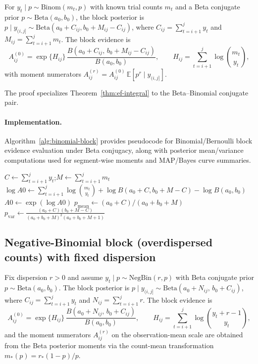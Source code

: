 \begin{proposition}
\label{prop:binomial-block}
For $y_t\mid p\sim\mathrm{Binom}(m_t,p)$ with known trial counts $m_t$ and a Beta conjugate prior
$p\sim\mathrm{Beta}(a_0,b_0)$, the block posterior is
$p\mid y_{(i,j]}\sim\mathrm{Beta}(a_0+C_{ij},b_0+M_{ij}-C_{ij})$, where
$C_{ij}=\sum_{t=i+1}^j y_t$ and $M_{ij}=\sum_{t=i+1}^j m_t$. The block evidence is
\[
A^{(0)}_{ij}
= \exp\{H_{ij}\}\,
\frac{B(a_0+C_{ij},\,b_0+M_{ij}-C_{ij})}{B(a_0,b_0)},
\qquad H_{ij}=\sum_{t=i+1}^j \log\binom{m_t}{y_t},
\]
with moment numerators $A^{(r)}_{ij}=A^{(0)}_{ij}\,\mathbb{E}[p^r\mid y_{(i,j]}]$.
\end{proposition}

The proof specializes Theorem~\ref{thm:ef-integral} to the Beta--Binomial conjugate pair.

\paragraph{Implementation.}
Algorithm~\ref{alg:binomial-block} provides pseudocode for Binomial/Bernoulli block evidence evaluation under Beta conjugacy, along with posterior mean/variance computations used for segment-wise moments and MAP/Bayes curve summaries.

\begin{algorithm}[H]
\caption{BinomialBlock$(y,m,i,j,a_0,b_0)$}
\label{alg:binomial-block}
\KwIn{Block $(i,j]$; successes $y_{i+1:j}$; trials $m_{i+1:j}$}
$C\leftarrow \sum_{t=i+1}^j y_t$;\quad $M\leftarrow \sum_{t=i+1}^j m_t$\;
$\log A0 \leftarrow \sum_{t=i+1}^j \log \binom{m_t}{y_t}
+ \log B(a_0+C,b_0+M-C)
- \log B(a_0,b_0)$\;
$A0\leftarrow \exp(\log A0)$\;
$p_{\text{mean}}\leftarrow (a_0+C)/(a_0+b_0+M)$\;
$p_{\text{var}}\leftarrow \frac{(a_0+C)(b_0+M-C)}
{(a_0+b_0+M)^2(a_0+b_0+M+1)}$\;
\end{algorithm}

\subsection{Negative-Binomial block (overdispersed counts) with fixed dispersion}
\label{sec:nb-block}

\begin{proposition}
\label{prop:negbin-block}
Fix dispersion $r>0$ and assume $y_t\mid p\sim\mathrm{NegBin}(r,p)$ with Beta conjugate prior
$p\sim\mathrm{Beta}(a_0,b_0)$. The block posterior is
$p\mid y_{(i,j]}\sim\mathrm{Beta}(a_0+N_{ij},\,b_0+C_{ij})$, where
$C_{ij}=\sum_{t=i+1}^j y_t$ and $N_{ij}=\sum_{t=i+1}^j r$. The block evidence is
\[
A^{(0)}_{ij}=\exp\{H_{ij}\}\,\frac{B(a_0+N_{ij},\,b_0+C_{ij})}{B(a_0,b_0)},
\qquad H_{ij}=\sum_{t=i+1}^j\log\binom{y_t+r-1}{y_t},
\]
and the moment numerators $A^{(r)}_{ij}$ on the observation-mean scale are obtained from the
Beta posterior moments via the count-mean transformation $m_*(p)=r_*(1-p)/p$.
\end{proposition}

